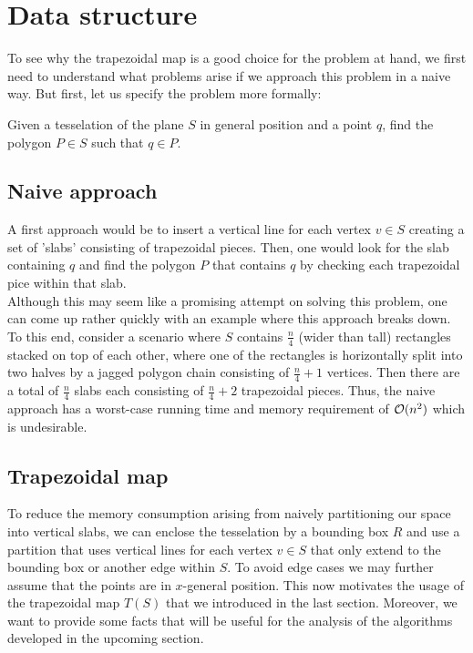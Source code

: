 \section{Data structure}
    To see why the trapezoidal map is a good choice for the problem at hand, we first need to understand what problems arise if we approach this problem in a naive way. But first, let us specify the problem more formally:
    \begin{mdframed}
        Given a tesselation of the plane $S$ in general position and a point $q$, find the polygon $P \in S$ such that $q \in P$.
    \end{mdframed} 

    \subsection{Naive approach} 
        A first approach would be to insert a vertical line for each vertex $v \in S$ creating a set of 'slabs' consisting of trapezoidal pieces. Then, one would look for the slab containing $q$ and find the polygon $P$ that contains $q$ by checking each trapezoidal pice within that slab. \\
        Although this may seem like a promising attempt on solving this problem, one can come up rather quickly with an example where this approach breaks down. To this end, consider a scenario where $S$ contains $\frac{n}{4}$ (wider than tall) rectangles stacked on top of each other, where one of the rectangles is horizontally split into two halves by a jagged polygon chain consisting of $\frac{n}{4} + 1$ vertices. Then there are a total of $\frac{n}{4}$ slabs each consisting of $\frac{n}{4} + 2$ trapezoidal pieces. Thus, the naive approach has a worst-case running time and memory requirement of $\mathcal{O}(n^2)$ which is undesirable. 
    
    \subsection{Trapezoidal map}
        To reduce the memory consumption arising from naively partitioning our space into vertical slabs, we can enclose the tesselation by a bounding box $R$ and use a partition that uses vertical lines for each vertex $v \in S$ that only extend to the bounding box or another edge within $S$. To avoid edge cases we may further assume that the points are in $x$-general position. This now motivates the usage of the trapezoidal map $T(S)$ that we introduced in the last section. Moreover, we want to provide some facts that will be useful for the analysis of the algorithms developed in the upcoming section. 

